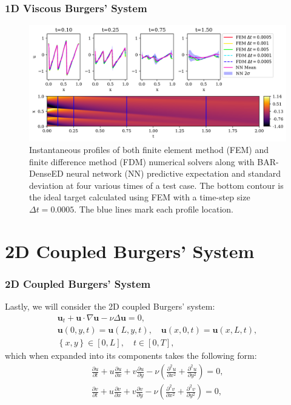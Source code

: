 \documentclass{beamer}
\theoremstyle{remark}
\newcommand{\viscosity}{\nu}
\begin{document}
\begin{frame}
\frametitle{1D Viscous Burgers' System}
\begin{figure}[H]
    \centering
    \includegraphics[width=\textwidth]{Fig15.png}
    \caption{Instantaneous profiles of both finite element method (FEM) and finite difference method (FDM) numerical solvers along with BAR-DenseED neural network (NN) predictive expectation and standard deviation at four various times of a test case.
    The bottom contour is the ideal target calculated using FEM with a time-step size $\Delta t =0.0005$.
    The blue lines mark each profile location.}
    \label{fig:burgers1D-profile2}
\end{figure}
\end{frame}


\section{2D Coupled Burgers' System}

\begin{frame}
\frametitle{2D Coupled Burgers' System}
Lastly, we will consider the 2D coupled Burgers' system:
\begin{gather}
    \bm{u}_t + \bm{u}\cdot \nabla \bm{u} - \viscosity \Delta \bm{u} = 0,\\
    \bm{u}(0,y,t) = \bm{u}(L,y,t), \quad \bm{u}(x,0,t) = \bm{u}(x,L,t), \\
    \left\{x,y \right\} \in [0,L], \quad t\in[0,T],
\end{gather}
which when expanded into its components takes the following form:
\begin{equation}
    \begin{aligned}
        {\frac{\partial u}{\partial t}+u \frac{\partial u}{\partial x}+v \frac{\partial u}{\partial y} - \viscosity \left(\frac{\partial^{2} u}{\partial x^{2}}+\frac{\partial^{2} u}{\partial y^{2}}\right)} = 0, \\ 
        {\frac{\partial v}{\partial t}+u \frac{\partial v}{\partial x}+v \frac{\partial v}{\partial y} - \viscosity \left(\frac{\partial^{2} v}{\partial x^{2}}+\frac{\partial^{2} v}{\partial y^{2}}\right)} = 0,
    \end{aligned}
\end{equation}

\end{frame}
\end{document}
